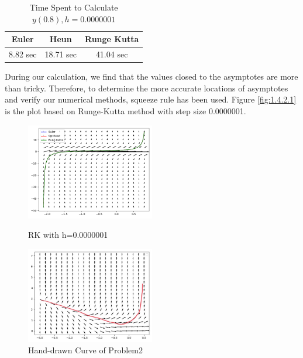 \documentclass[11pt,a4paper]{article}
\begin{document}
\begin{table}[H]
	\begin{center}
		\small
		\begin{tabular}{c|c|c}
			\renewcommand{\multirowsetup}{\centering}
			Euler			&Heun			&Runge Kutta	\\ \hline
			8.82 sec		&18.71 sec		&41.04 sec		\\
		\end{tabular}
		\setlength{\abovecaptionskip}{0.1cm}
		\setlength{\belowcaptionskip}{-0.9cm}
		\caption{Time Spent to Calculate $y(0.8), h = 0.0000001$} \label{tab:tab1.4.2.1}
	\end{center}
\end{table}

During our calculation, we find that the values closed to the asymptotes are more than tricky. Therefore, to determine the more accurate locations of asymptotes and verify our numerical methods, squeeze rule has been used. Figure \ref{fig:1.4.2.1} is the plot based on Runge-Kutta method with step size 0.0000001.

\begin{center}
	\begin{figure}[H]
		\centering
		\begin{minipage}[b]{0.4\textwidth}
			\centering
			\includegraphics[width=0.5\textwidth]{P1FinalSolution.png}
			\caption{RK with h=0.0000001}
			\label{fig:1.4.2.1}
		\end{minipage}
		\begin{minipage}[b]{0.4\textwidth}
			\centering
			\includegraphics[width=0.5\textwidth]{Problem2HandSketch.jpeg}
			\caption{Hand-drawn Curve of Problem2}
			\label{fig:2.0.1}
		\end{minipage}
	\end{figure}
\end{center}
\end{document}
